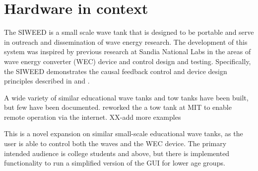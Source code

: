 \documentclass[11pt, letterpaper]{article}
\begin{document}
\section{Hardware in context} %
The SIWEED is a small scale wave tank that is designed to be portable and serve in outreach and dissemination of wave energy research.
The development of this system was inspired by previous research at Sandia National Labs in the areas of wave energy converter (WEC) device and control design and testing.
Specifically, the SIWEED demonstrates the causal feedback control and device design principles described in \citet{Bacelli2020} and \citet{Coe2020a}.


A wide variety of similar educational wave tanks and tow tanks have been built, but few have been documented.
\citet{unger2006creating} reworked the a tow tank at MIT to enable remote operation via the internet.
XX-add more examples

This is a novel expansion on similar small-scale educational wave tanks, as the user is able to control both the waves and the WEC device. The primary intended audience is college students and above, but there is implemented functionality to run a simplified version of the GUI for lower age groups.
\end{document}
